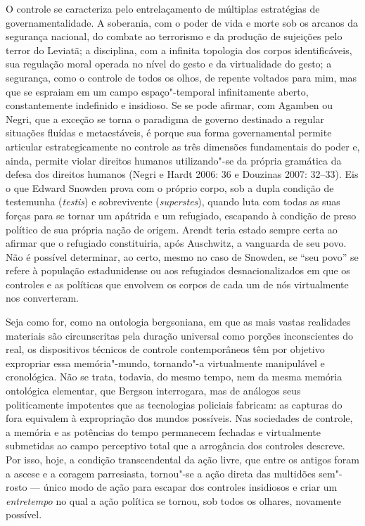 O controle se caracteriza pelo entrelaçamento de múltiplas estratégias
de governamentalidade. A soberania, com o poder de vida e morte sob os
arcanos da segurança nacional, do combate ao terrorismo e da produção de
sujeições pelo terror do Leviatã; a disciplina, com a infinita topologia
dos corpos identificáveis, sua regulação moral operada no nível do gesto
e da virtualidade do gesto; a segurança, como o controle de todos os
olhos, de repente voltados para mim, mas que se espraiam em um campo
espaço"-temporal infinitamente aberto, constantemente indefinido e
insidioso. Se se pode afirmar, com Agamben ou Negri, que a exceção se
torna o paradigma de governo destinado a regular situações fluídas e
metaestáveis, é porque sua forma governamental permite articular
estrategicamente no controle as três dimensões fundamentais do poder e,
ainda, permite violar direitos humanos utilizando"-se da própria
gramática da defesa dos direitos humanos (Negri e Hardt 2006: 36 e
Douzinas 2007: 32--33). Eis o que Edward Snowden prova com o próprio
corpo, sob a dupla condição de testemunha (\emph{testis}) e sobrevivente
(\emph{superstes}), quando luta com todas as suas forças para se tornar
um apátrida e um refugiado, escapando à condição de preso político de
sua própria nação de origem. Arendt teria estado sempre certa ao afirmar
que o refugiado constituiria, após Auschwitz, a vanguarda de seu povo.
Não é possível determinar, ao certo, mesmo no caso de Snowden, se ``seu
povo'' se refere à população estadunidense ou aos refugiados
desnacionalizados em que os controles e as políticas que envolvem os
corpos de cada um de nós virtualmente nos converteram.

Seja como for, como na ontologia bergsoniana, em que as mais vastas
realidades materiais são circunscritas pela duração universal como
porções inconscientes do real, os dispositivos técnicos de controle
contemporâneos têm por objetivo expropriar essa memória"-mundo,
tornando"-a virtualmente manipulável e cronológica. Não se trata,
todavia, do mesmo tempo, nem da mesma memória ontológica elementar, que
Bergson interrogara, mas de análogos seus politicamente impotentes que
as tecnologias policiais fabricam: as capturas do fora equivalem à
expropriação dos mundos possíveis. Nas sociedades de controle, a memória
e as potências do tempo permanecem fechadas e virtualmente submetidas ao
campo perceptivo total que a arrogância dos controles descreve. Por
isso, hoje, a condição transcendental da ação livre, que entre os
antigos foram a ascese e a coragem parresiasta, tornou"-se a ação direta
das multidões sem"-rosto --- único modo de ação para escapar dos controles
insidiosos e criar um \emph{entretempo} no qual a ação política se
tornou, sob todos os olhares, novamente possível.

